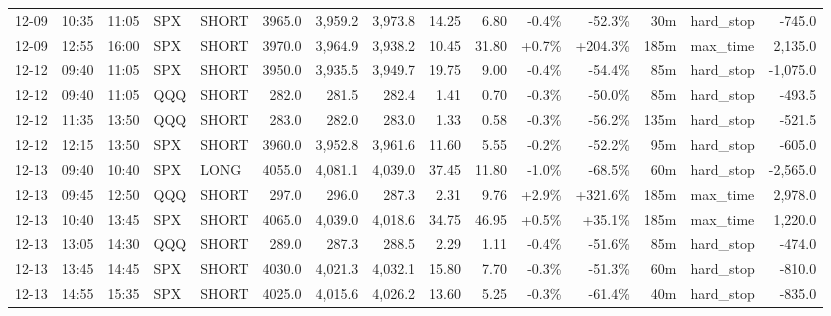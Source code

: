 \documentclass[11pt,a4paper,twoside]{article}
\begin{document}
\begin{landscape}
\begin{center}
\begin{longtable}{>{\color{txtmain}}l l l l l r r r r r r r r >{\color{txtmain}}l r}
12-09 & 10:35 & 11:05 & SPX & SHORT & 3965.0 & 3,959.2 & 3,973.8 & 14.25 & 6.80 & \textcolor{lossred}{-0.4\%} & \textcolor{lossred}{-52.3\%} & 30m & hard\_stop & \textcolor{lossred}{-745.0} \\
12-09 & 12:55 & 16:00 & SPX & SHORT & 3970.0 & 3,964.9 & 3,938.2 & 10.45 & 31.80 & \textcolor{wingreen}{+0.7\%} & \textcolor{wingreen}{+204.3\%} & 185m & max\_time & \textcolor{wingreen}{2,135.0} \\
12-12 & 09:40 & 11:05 & SPX & SHORT & 3950.0 & 3,935.5 & 3,949.7 & 19.75 & 9.00 & \textcolor{lossred}{-0.4\%} & \textcolor{lossred}{-54.4\%} & 85m & hard\_stop & \textcolor{lossred}{-1,075.0} \\
12-12 & 09:40 & 11:05 & QQQ & SHORT & 282.0 & 281.5 & 282.4 & 1.41 & 0.70 & \textcolor{lossred}{-0.3\%} & \textcolor{lossred}{-50.0\%} & 85m & hard\_stop & \textcolor{lossred}{-493.5} \\
12-12 & 11:35 & 13:50 & QQQ & SHORT & 283.0 & 282.0 & 283.0 & 1.33 & 0.58 & \textcolor{lossred}{-0.3\%} & \textcolor{lossred}{-56.2\%} & 135m & hard\_stop & \textcolor{lossred}{-521.5} \\
12-12 & 12:15 & 13:50 & SPX & SHORT & 3960.0 & 3,952.8 & 3,961.6 & 11.60 & 5.55 & \textcolor{lossred}{-0.2\%} & \textcolor{lossred}{-52.2\%} & 95m & hard\_stop & \textcolor{lossred}{-605.0} \\
12-13 & 09:40 & 10:40 & SPX & LONG & 4055.0 & 4,081.1 & 4,039.0 & 37.45 & 11.80 & \textcolor{lossred}{-1.0\%} & \textcolor{lossred}{-68.5\%} & 60m & hard\_stop & \textcolor{lossred}{-2,565.0} \\
12-13 & 09:45 & 12:50 & QQQ & SHORT & 297.0 & 296.0 & 287.3 & 2.31 & 9.76 & \textcolor{wingreen}{+2.9\%} & \textcolor{wingreen}{+321.6\%} & 185m & max\_time & \textcolor{wingreen}{2,978.0} \\
12-13 & 10:40 & 13:45 & SPX & SHORT & 4065.0 & 4,039.0 & 4,018.6 & 34.75 & 46.95 & \textcolor{wingreen}{+0.5\%} & \textcolor{wingreen}{+35.1\%} & 185m & max\_time & \textcolor{wingreen}{1,220.0} \\
12-13 & 13:05 & 14:30 & QQQ & SHORT & 289.0 & 287.3 & 288.5 & 2.29 & 1.11 & \textcolor{lossred}{-0.4\%} & \textcolor{lossred}{-51.6\%} & 85m & hard\_stop & \textcolor{lossred}{-474.0} \\
12-13 & 13:45 & 14:45 & SPX & SHORT & 4030.0 & 4,021.3 & 4,032.1 & 15.80 & 7.70 & \textcolor{lossred}{-0.3\%} & \textcolor{lossred}{-51.3\%} & 60m & hard\_stop & \textcolor{lossred}{-810.0} \\
12-13 & 14:55 & 15:35 & SPX & SHORT & 4025.0 & 4,015.6 & 4,026.2 & 13.60 & 5.25 & \textcolor{lossred}{-0.3\%} & \textcolor{lossred}{-61.4\%} & 40m & hard\_stop & \textcolor{lossred}{-835.0} \\

\end{longtable}
\end{center}
\end{landscape}
\end{document}
